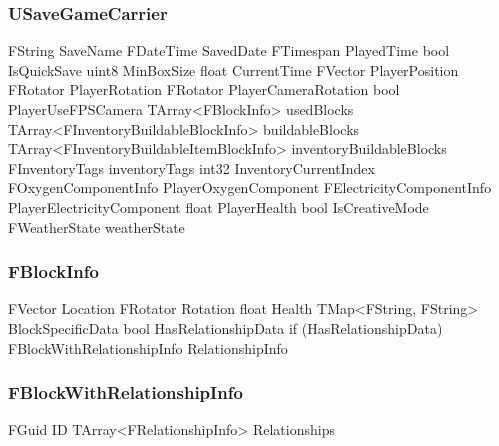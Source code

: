 \subsubsection{USaveGameCarrier}
\begin{code}
FString                                     SaveName
FDateTime                                   SavedDate
FTimespan                                   PlayedTime
bool                                        IsQuickSave
uint8                                       MinBoxSize
float                                       CurrentTime
FVector                                     PlayerPosition
FRotator                                    PlayerRotation
FRotator                                    PlayerCameraRotation
bool                                        PlayerUseFPSCamera
TArray<FBlockInfo>                          usedBlocks
TArray<FInventoryBuildableBlockInfo>        buildableBlocks
TArray<FInventoryBuildableItemBlockInfo>    inventoryBuildableBlocks
FInventoryTags                              inventoryTags
int32                                       InventoryCurrentIndex
FOxygenComponentInfo                        PlayerOxygenComponent
FElectricityComponentInfo                   PlayerElectricityComponent
float                                       PlayerHealth
bool                                        IsCreativeMode
FWeatherState                               weatherState
\end{code}


\newpage

\subsubsection{FBlockInfo}

\begin{code}
[FBlockBaseInfo]
FVector                                     Location
FRotator                                    Rotation
float                                       Health
TMap<FString, FString>                      BlockSpecificData
bool                                        HasRelationshipData
if (HasRelationshipData)
    FBlockWithRelationshipInfo              RelationshipInfo
\end{code}




\subsubsection{FBlockWithRelationshipInfo}
\begin{code}
FGuid                                       ID
TArray<FRelationshipInfo>                   Relationships
\end{code}


